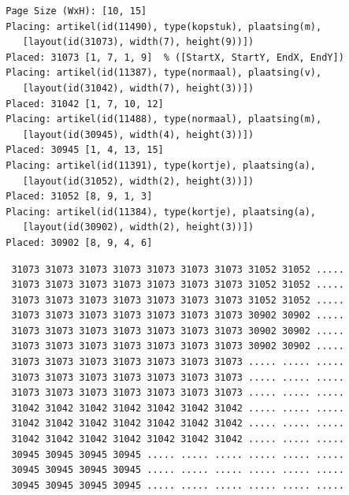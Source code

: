 \documentclass[a4paper,12pt]{report}
\begin{document}
\begin{listing}
	\begin{verbatim}
		Page Size (WxH): [10, 15]
		Placing: artikel(id(11490), type(kopstuk), plaatsing(m), 
		   [layout(id(31073), width(7), height(9))])
		Placed: 31073 [1, 7, 1, 9]  % ([StartX, StartY, EndX, EndY])
		Placing: artikel(id(11387), type(normaal), plaatsing(v), 
		   [layout(id(31042), width(7), height(3))])
		Placed: 31042 [1, 7, 10, 12]
		Placing: artikel(id(11488), type(normaal), plaatsing(m), 
		   [layout(id(30945), width(4), height(3))])
		Placed: 30945 [1, 4, 13, 15]
		Placing: artikel(id(11391), type(kortje), plaatsing(a), 
		   [layout(id(31052), width(2), height(3))])
		Placed: 31052 [8, 9, 1, 3]
		Placing: artikel(id(11384), type(kortje), plaatsing(a), 
		   [layout(id(30902), width(2), height(3))])
		Placed: 30902 [8, 9, 4, 6]
	\end{verbatim}
  \caption{Algoritme 1: Opeenvolgende geplaatste artikels}
  \label{listing:opeenvolgendegeplaatsteartikels}
\end{listing}

\begin{listing}
	\begin{verbatim}
		 31073 31073 31073 31073 31073 31073 31073 31052 31052 .....
		 31073 31073 31073 31073 31073 31073 31073 31052 31052 .....
		 31073 31073 31073 31073 31073 31073 31073 31052 31052 .....
		 31073 31073 31073 31073 31073 31073 31073 30902 30902 .....
		 31073 31073 31073 31073 31073 31073 31073 30902 30902 .....
		 31073 31073 31073 31073 31073 31073 31073 30902 30902 .....
		 31073 31073 31073 31073 31073 31073 31073 ..... ..... .....
		 31073 31073 31073 31073 31073 31073 31073 ..... ..... .....
		 31073 31073 31073 31073 31073 31073 31073 ..... ..... .....
		 31042 31042 31042 31042 31042 31042 31042 ..... ..... .....
		 31042 31042 31042 31042 31042 31042 31042 ..... ..... .....
		 31042 31042 31042 31042 31042 31042 31042 ..... ..... .....
		 30945 30945 30945 30945 ..... ..... ..... ..... ..... .....
		 30945 30945 30945 30945 ..... ..... ..... ..... ..... .....
		 30945 30945 30945 30945 ..... ..... ..... ..... ..... .....
	\end{verbatim}
  \caption{Algoritme 1: Layout van de eerste oplossing}
  \label{listing:layouteersteopl}
\end{listing}
\end{document}

